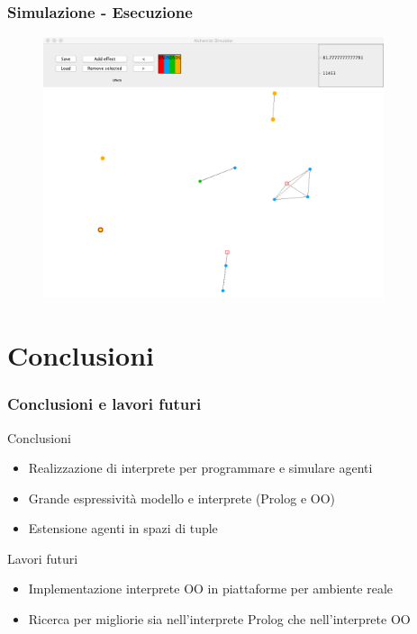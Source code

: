 \documentclass[handout]{beamer}\mode<presentation>{\usetheme{AMSCesenaBleu}}
\begin{document}

\begin{frame}
\frametitle{Simulazione - Esecuzione}
\vspace*{-0.25cm}
\begin{figure}
\includegraphics[width=10cm]{images/simul_harvest2.png}
\end{figure}
\end{frame}


\section{Conclusioni}

\begin{frame}
\frametitle{Conclusioni e lavori futuri}
\begin{block}{Conclusioni}
\begin{itemize}
\item Realizzazione di interprete per programmare e simulare agenti
\item Grande espressività modello e interprete (Prolog e OO)
\item Estensione agenti in spazi di tuple 
\end{itemize}
\end{block}
\begin{block}{Lavori futuri}
\begin{itemize}
\item Implementazione interprete OO in piattaforme per ambiente reale
\item Ricerca per migliorie sia nell'interprete Prolog che nell'interprete OO
\end{itemize}
\end{block}
\end{frame}

\section{}
\subsection{}
\maketitle
\end{document}
